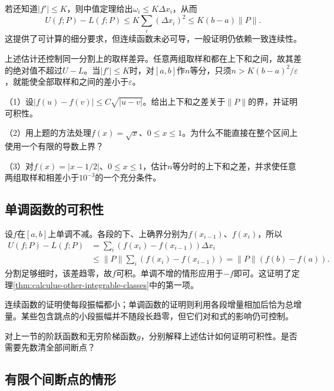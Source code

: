 若还知道\(|f'|\le K\)，则中值定理给出\(\omega_i\le K\Delta x_i\)，从而
\begin{equation*}
 U(f;P)-L(f;P)\le K\sum_i(\Delta x_i)^2\le K(b-a)\|P\|.
\end{equation*}
这提供了可计算的细分要求，但连续函数未必可导，一般证明仍依赖一致连续性。

上述估计还控制同一分割上的取样差异。任意两组取样和都在上下和之间，故其差的绝对值不超过\(U-L\)。当\(|f'|\le K\)时，对\([a,b]\)作\(n\)等分，只须\(n>K(b-a)^2/\varepsilon\)，就能使全部取样和之间的差小于\(\varepsilon\)。

\begin{exercise}
\mbox{}\par\nobreak

（1）设\(|f(u)-f(v)|\le C\sqrt{|u-v|}\)。给出上下和之差关于\(\|P\|\)的界，并证明可积性。

（2）用上题的方法处理\(f(x)=\sqrt{x}\)、\(0\le x\le1\)。为什么不能直接在整个区间上使用一个有限的导数上界？

（3）对\(f(x)=|x-1/2|\)、\(0\le x\le1\)，估计\(n\)等分时的上下和之差，并求使任意两组取样和相差小于\(10^{-3}\)的一个充分条件。
\end{exercise}

\subsection{单调函数的可积性}

设\(f\)在\([a,b]\)上单调不减。各段的下、上确界分别为\(f(x_{i-1})\)、\(f(x_i)\)，所以
\begin{equation*}
 \begin{aligned}
 U(f;P)-L(f;P)
 &=\sum_i(f(x_i)-f(x_{i-1}))\Delta x_i\\
 &\le\|P\|\sum_i(f(x_i)-f(x_{i-1}))
 =\|P\|(f(b)-f(a)).
 \end{aligned}
\end{equation*}
分割足够细时，该差趋零，故\(f\)可积。单调不增的情形应用于\(-f\)即可。这证明了定理\ref{thm:calculus-other-integrable-classes}中的第一项。

连续函数的证明使每段振幅都小；单调函数的证明则利用各段增量相加后恰为总增量。某些包含跳点的小段振幅并不随段长趋零，但它们对和式的影响仍可控制。

\begin{example}
对上一节的阶跃函数和无穷阶梯函数\(g\)，分别解释上述估计如何证明可积性。是否需要先数清全部间断点？
\end{example}

\subsection{有限个间断点的情形}

